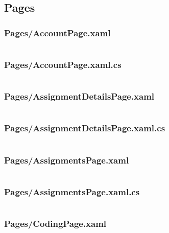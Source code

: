 \documentclass[a4paper]{report}
\begin{document}
\inputminted{csharp}{"../src/Algorithm Dynamics/Models/StatisticsItem.cs"}

\subsection{Pages}

\subsubsection{Pages/AccountPage.xaml}

\inputminted{xml}{"../src/Algorithm Dynamics/Pages/AccountPage.xaml"}

\subsubsection{Pages/AccountPage.xaml.cs}

\inputminted{csharp}{"../src/Algorithm Dynamics/Pages/AccountPage.xaml.cs"}

\subsubsection{Pages/AssignmentDetailsPage.xaml}

\inputminted{xml}{"../src/Algorithm Dynamics/Pages/AssignmentDetailsPage.xaml"}

\subsubsection{Pages/AssignmentDetailsPage.xaml.cs}

\inputminted{csharp}{"../src/Algorithm Dynamics/Pages/AssignmentDetailsPage.xaml.cs"}

\subsubsection{Pages/AssignmentsPage.xaml}

\inputminted{xml}{"../src/Algorithm Dynamics/Pages/AssignmentsPage.xaml"}

\subsubsection{Pages/AssignmentsPage.xaml.cs}

\inputminted{csharp}{"../src/Algorithm Dynamics/Pages/AssignmentsPage.xaml.cs"}

\subsubsection{Pages/CodingPage.xaml}
\end{document}
